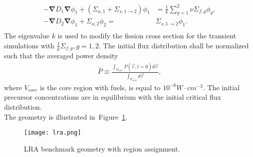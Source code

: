 \documentclass[10pt]{scrartcl}
\newcommand{\grad}{\bs{\nabla}}
\newcommand{\fig}[1]{Figure~\ref{#1}}                      %
\newcommand{\bs}[1]{\mathbf{#1}}
\begin{document}
\begin{align}
-\grad D_1 \grad\phi_1 + (\Sigma_{a,1} + \Sigma_{s, 1\rightarrow 2})\phi_1 &= \frac{1}{k}\sum_{g=1}^2 \nu\Sigma_{f,g}\phi_g, \\
-\grad D_2 \grad\phi_1 + \Sigma_{a,2}\phi_2 =& \Sigma_{s, 1\rightarrow 2}\phi_1. \\
\end{align}
The eigenvalue $k$ is used to modify the fission cross section for the transient simulations with $\frac{1}{k}\Sigma_{f,g}, g=1,2$.  The initial flux distribution shall be normalized such that the averaged power density
\begin{align}
\bar{P} \equiv \frac{\int_{V_{core}} P(\vec{r}, t=0) d\vec{r}}{\int_{V_{core}} d\vec{r}},
\end{align}
where $V_{core}$ is the core region with fuels, is equal to $10^{-6} W\cdot cm^{-3}$.
The initial precursor concentrations are in equilibrium with the initial critical flux distribution.\\

The geometry is illustrated in~\fig{fig:lra-geometry}.\\
\begin{figure}[H]
\centering
\texttt{[image: lra.png]}
\caption{LRA benchmark geometry with region assignment.}
\label{fig:lra-geometry}
\end{figure}
\end{document}
